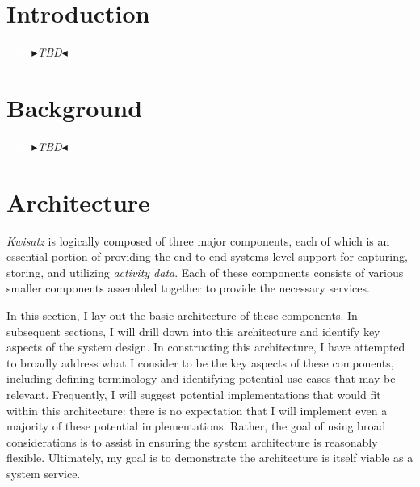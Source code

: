 \documentclass[sigconf,anonymous,review]{acmart}
\author{Tony Mason}
\title{\system}
\subtitle{Enabling Activity Context}
\newcommand{\system}[0]{\emph{Kwisatz}\xspace}
\newcommand{\nbc}[3]{
 {\colorbox{#3}{\bfseries\sffamily\scriptsize\textcolor{white}{#1}}}
 {\textcolor{#3}{\sf\small$\blacktriangleright$\textit{#2}$\blacktriangleleft$}}}
\newcommand\tm[1]{\nbc{TM}{#1}{tmcolor}}
\begin{document}
\begin{abstract}
    Our ability to find digital data is reaching a tipping point: brute force
    search techniques are inefficient and searching multiple storage locations
    to find related objects is challenging.  Prior research found using
    contextual clues facilitates finding specific digital objects. Despite
    modern systems collecting vast amounts of contextual information, our
    systems do not provide an efficient mechanism for using that information to
    facilitate more efficient \emph{finding} of digital objects.

    \emph{\system} is our system for collecting, storing, and
    disseminating contextual information we call \emph{activity context} to
    facilitate finding groups of related digital objects regardless of where
    those objects are stored.  We find \emph{\system} is a viable way to
    provide \emph{activity context} and enabling its use by other services and
    applications.
\end{abstract}

\maketitle

\section{Introduction}

\tm{TBD}

\section{Background}

\tm{TBD}

\section{Architecture}\label{sec:Architecture}

\system is logically composed of three major components, each of which is an
essential portion of providing the end-to-end systems level support for
capturing, storing, and utilizing \emph{activity data}.  Each of these
components consists of various smaller components assembled together to provide
the necessary services.

In this section, I lay out the basic architecture of these components.  In
subsequent sections, I will drill down into this architecture and identify key
aspects of the system design. In constructing this architecture, I have
attempted to broadly address what I consider to be the key aspects of these
components, including defining terminology and identifying potential use cases
that may be relevant.  Frequently, I will suggest potential implementations that
would fit within this architecture: there is no expectation that I will
implement even a majority of these potential implementations.  Rather, the goal
of using broad considerations is to assist in ensuring the system architecture
is reasonably flexible. Ultimately, my goal is to demonstrate the architecture
is itself viable as a system service.
\end{document}
